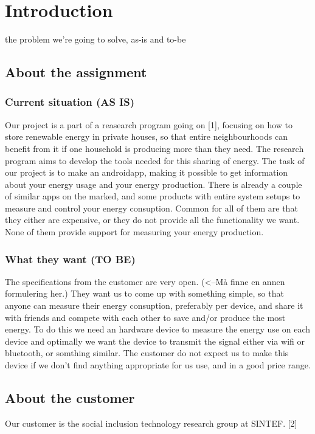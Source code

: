 \chapter{Introduction}
the problem we're going to solve, as-is and to-be

\section{About the assignment}
\subsection{Current situation (AS IS)}
Our project is a part of a reasearch program going on [1], focusing on how to store renewable energy in private houses, so that entire neighbourhoods can benefit from it if one household is producing more than they need. The research program aims to develop the tools needed for this sharing of energy. The task of our project is to make an androidapp, making it possible to get information about your energy usage and your energy production. There is already a couple of similar apps on the marked, and some products with entire system setups to measure and control your energy consuption. Common for all of them are that they either are expensive, or they do not provide all the functionality we want. None of them provide support for measuring your energy production.  

\subsection{What they want (TO BE)}
The specifications from the customer are very open. (<--Må finne en annen formulering her.) They want us to come up with something simple, so that anyone can measure their energy consuption, preferably per device, and share it with friends and compete with each other to save and/or produce the most energy. To do this we need an hardware device to measure the energy use on each device and optimally we want the device to transmit the signal either via wifi or bluetooth, or somthing similar. The customer do not expect us to make this device if we don’t find anything appropriate for us use, and in a good price range.

\section{About the customer}

Our customer is the social inclusion technology research group at SINTEF. [2]








 


